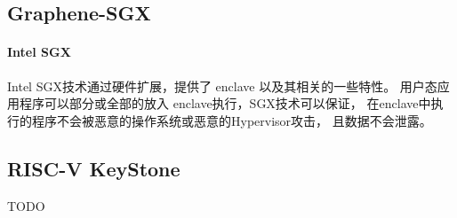 \subsection{Graphene-SGX}
\paragraph{Intel SGX}Intel SGX技术通过硬件扩展，提供了 enclave 以及其相关的一些特性。
用户态应用程序可以部分或全部的放入 enclave执行，SGX技术可以保证，
在enclave中执行的程序不会被恶意的操作系统或恶意的Hypervisor攻击，
且数据不会泄露。

\subsection{RISC-V KeyStone}
TODO


